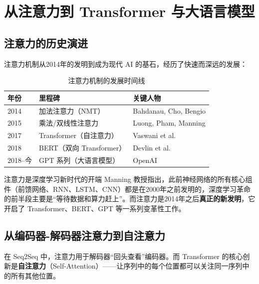 \section{从注意力到 Transformer 与大语言模型}

\subsection{注意力的历史演进}

注意力机制从2014年的发明到成为现代 AI 的基石，经历了快速而深远的发展：

\begin{table}[H]
\centering
\begin{tabular}{lll}
\toprule
\textbf{年份} & \textbf{里程碑} & \textbf{关键人物} \\
\midrule
2014 & 加法注意力（NMT） & Bahdanau, Cho, Bengio \\
2015 & 乘法/双线性注意力 & Luong, Pham, Manning \\
2017 & Transformer（自注意力） & Vaswani et al. \\
2018 & BERT（双向 Transformer） & Devlin et al. \\
2018--今 & GPT 系列（大语言模型） & OpenAI \\
\bottomrule
\end{tabular}
\caption{注意力机制的发展时间线}
\end{table}

\begin{importantbox}{注意力是深度学习新时代的开端}
Manning 教授指出，此前神经网络的所有核心组件（前馈网络、RNN、LSTM、CNN）都是在2000年之前发明的，深度学习革命的前半段主要是``等待数据和算力赶上''。而注意力是2014年之后\textbf{真正的新发明}，它开启了 Transformer、BERT、GPT 等一系列变革性工作。
\end{importantbox}

\subsection{从编码器-解码器注意力到自注意力}

在 Seq2Seq 中，注意力用于解码器``回头查看''编码器。而 Transformer 的核心创新是\textbf{自注意力}（Self-Attention）——让序列中的每个位置都可以关注同一序列中的所有其他位置。

